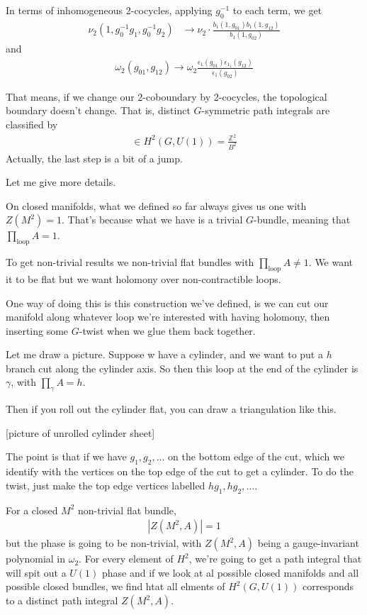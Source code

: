 In terms of inhomogeneous 2-cocycles,
applying $g_0^{-1}$ to each term,
we get
\begin{align}
    \nu_2(1, g_0^{-1} g_1, g_{0}^{-1} g_2)
    &\to
    \nu_2 \cdot
    \frac{b_1(1, g_{01}) b_1(1, g_{12})}{b_1(1, g_{02})}
\end{align}
and
\begin{align}
    \omega_2(g_{01}, g_{12}) \to
    \omega_2
    \frac{\epsilon_1(g_{01}) \epsilon_1_1\left( g_{12} \right)}{\epsilon_1\left(
    g_{02} \right)}
\end{align}

That means, if we change our 2-coboundary by 2-cocycles,
the topological boundary doesn't change.
That is,
distinct $G$-symmetric path integrals are classified by
\begin{align}
    [\nu_2] \in
    H^2\left( G, U(1) \right)
    = \frac{\mathbb{Z}^2}{B^2}
\end{align}
Actually,
the last step is a bit of a jump.

Let me give more details.

On closed manifolds,
what we defined so far always gives us one with
$Z(M^2)=1$.
That's because what we have is a trivial $G$-bundle,
meaning that
$\prod_{\textrm{loop}}A=1$.

To get non-trivial results we non-trivial flat bundles with
$\prod_{\textrm{loop}}A \ne 1$.
We want it to be flat but we want holomony over non-contractible loops.

One way of doing this is this construction we've defined,
is we can cut our manifold along whatever loop we're interested with having
holomony,
then inserting some $G$-twist when we glue them back together.

Let me draw a picture.
Suppose w have a cylinder,
and we want to put a $h$ branch cut along the cylinder axis.
So then this loop at the end of the cylinder is $\gamma$,
with $\prod_\gamma A = h$.

Then if you roll out the cylinder flat,
you can draw a triangulation like this.

[picture of unrolled cylinder sheet]

The point is that if we have $g_1,g_2,\ldots$ on the bottom edge of the cut,
which we identify with the vertices on the top edge of the cut to get a
cylinder.
To do the twist,
just make the top edge vertices labelled $hg_1, hg_2, \ldots$.

For a closed $M^2$
non-trivial flat bundle,
\begin{align}
    |Z(M^2, A)| = 1
\end{align}
but the phase is going to be non-trivial,
with $Z(M^2, A)$ being a gauge-invariant polynomial in $\omega_2$.
For every element of $H^2$,
we're going to get a path integral that will spit out a $U(1)$ phase and if we
look at al possible closed manifolds and all possible closed bundles,
we find htat all elments of $H^2(G, U(1))$ corresponds to a distinct path
integral $Z(M^2, A)$.

